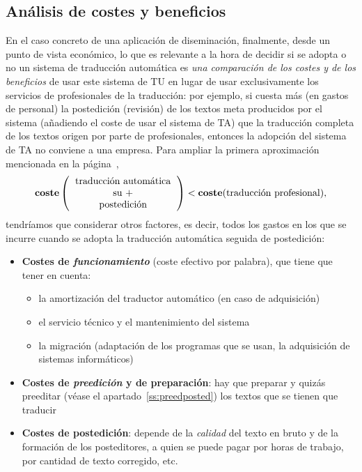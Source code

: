 \subsection{Análisis de costes y beneficios} \label{ss:costdetall} En el caso concreto de una aplicación de diseminación, finalmente, desde un punto de vista económico, lo que es relevante a la hora de decidir si se adopta o no un sistema de traducción automática es \emph{una comparación de los costes y de los beneficios} de usar este sistema de TU en lugar de usar exclusivamente los servicios de profesionales de la traducción: por ejemplo, si cuesta más (en gastos de personal) la postedición (revisión) de los textos meta producidos por el sistema (añadiendo el coste de usar el sistema de TA) que la traducción completa de los textos origen por parte de profesionales, entonces la adopción del sistema de TA no conviene a una empresa. Para ampliar la primera aproximación mencionada en la página~\pageref{pg:cost}, $$\textbf{coste}\left(\mbox{\begin{tabular}{c}traducción automática\\su +\\ postedición\end{tabular}}\right) < \textbf{coste}(\mbox{traducción profesional}), $$ tendríamos que considerar otros factores, es decir, todos los gastos en los que se incurre cuando se adopta la traducción automática seguida de postedición: \begin{itemize} \item \textbf{Costes de \emph{funcionamiento}} (coste efectivo por palabra), que tiene que tener en cuenta: \begin{itemize} \item la amortización del traductor automático (en caso de adquisición) \item el servicio técnico y el mantenimiento del sistema \item la migración (adaptación de los programas que se usan, la adquisición de sistemas informáticos) \end{itemize} 

\item \textbf{Costes de \emph{preedición} y de preparación}: hay que preparar y quizás preeditar (véase el apartado~\ref{ss:preedposted}) los textos que se tienen que traducir 

\item \textbf{Costes de postedición}: depende de la \emph{calidad} del texto en bruto y de la formación de los posteditores, a quien se puede pagar por horas de trabajo, por cantidad de texto corregido, etc. 


\end{itemize}

